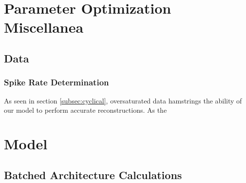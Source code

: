 \begin{appendices}
	\chapter{Parameter Optimization Miscellanea}
	\section{Data}
	\subsection{Spike Rate Determination}
	As seen in section \ref{subsec:cyclical}, oversaturated data hamstrings the 
	ability of our model to perform accurate reconstructions. As the 

	\chapter{Model}
	\section{Batched Architecture Calculations}
	\label{asec:batched}


\end{appendices}

